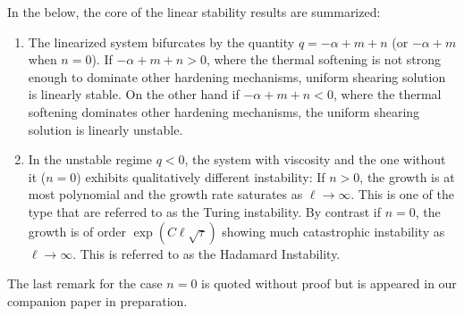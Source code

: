 \documentclass[a4paper,11pt]{article}
\theoremstyle{remark}
\begin{document}
In the below, the core of the linear stability results are summarized:
\begin{enumerate}
 \item The linearized system bifurcates by the quantity $q=-\alpha+m+n$ (or $-\alpha+m$ when $n=0$). If $-\alpha+m+n>0$, where the thermal softening is not strong enough to dominate other hardening mechanisms, uniform shearing solution is linearly stable. On the other hand if $-\alpha+m+n<0$, where the thermal softening dominates other hardening mechanisms, the uniform shearing solution is linearly unstable.%
 \item In the unstable regime $q<0$, the system with viscosity and the one without it ($n=0$) exhibits qualitatively different instability: If $n>0$, the growth is at most polynomial and the growth rate saturates as $\ell \rightarrow \infty$. This is one of the type that are referred to as the Turing instability. By contrast if $n=0$, the growth is of order $\exp\left(C\ell\sqrt{\tau}\right)$ showing much catastrophic instability as $\ell \rightarrow \infty$. This is referred to as the Hadamard Instability.
\end{enumerate}
The last remark for the case $n=0$ is quoted without proof but is appeared in our companion paper in preparation.
\end{document}
